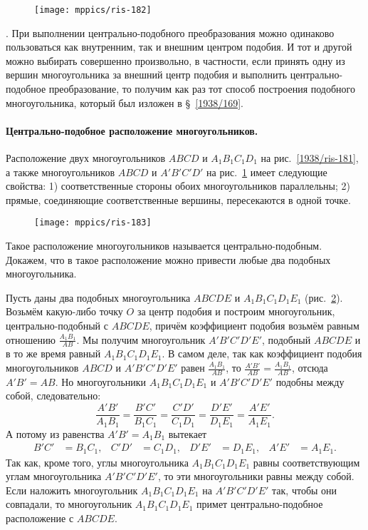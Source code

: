 \begin{figure}[h]
\centering
\texttt{[image: mppics/ris-182]}
\caption{}\label{1938/ris-182}
\end{figure}

\smallskip
{}.
При выполнении центрально-подобного преобразования можно одинаково пользоваться как внутренним, так и внешним центром подобия.
И тот и другой можно выбирать совершенно произвольно, в частности, если принять одну из вершин многоугольника за внешний центр подобия и выполнить центрально-подобное преобразование, то получим как раз тот способ построения подобного многоугольника, который был изложен в §~\ref{1938/169}.

\paragraph{Центрально-подобное расположение многоугольников.}\label{1938/176}
Расположение двух многоугольников $ABCD$ и $A_1B_1C_1D_1$ на рис.~\ref{1938/ris-181}, а также многоугольников $ABCD$ и $A'B'C'D'$ на рис.~\ref{1938/ris-182} имеет следующие свойства:
1) соответственные стороны обоих многоугольников параллельны;
2) прямые, соединяющие соответственные вершины, пересекаются в одной точке.

\begin{figure}[h]
\centering
\texttt{[image: mppics/ris-183]}
\caption{}\label{1938/ris-183}
\end{figure}

{\sloppy 
Такое расположение многоугольников называется центрально-подобным. 
Докажем, что в такое расположение можно привести любые два подобных многоугольника.

}

Пусть даны два подобных многоугольника $ABCDE$ и $A_1B_1C_1D_1E_1$ (рис.~\ref{1938/ris-183}).
Возьмём какую-либо точку $O$ за центр подобия и построим многоугольник, центрально-подобный  с $ABCDE$, причём коэффициент подобия возьмём равным отношению $\frac{A_1B_1}{AB}$.
Мы получим многоугольник $A'B'C'D'E'$, подобный $ABCDE$ и в то же время равный $A_1B_1C_1D_1E_1$.
В самом деле, так как коэффициент подобия многоугольников $ABCD$ и $A'B'C'D'E'$ равен $\frac{A_1B_1}{AB}$, то $\frac{A'B'}{AB}=\frac{A_1B_1}{AB}$, отсюда $A'B'=AB$.
Но многоугольники $A_1B_1C_1D_1E_1$ и $A'B'C'D'E'$ подобны между собой, следовательно:
\[\frac{A'B'}{A_1B_1}=\frac{B'C'}{B_1C_1}=\frac{C'D'}{C_1D_1}=\frac{D'E'}{D_1E_1}=\frac{A'E'}{A_1E_1}.\]
А потому из равенства $A'B'=A_1B_1$ вытекает 
\begin{align*}
B'C'&=B_1C_1,&
C'D'&=C_1D_1,&
D'E'&=D_1E_1,&
A'E'&=A_1E_1.
\end{align*}
Так как, кроме того, углы многоугольника $A_1B_1C_1D_1E_1$ равны соответствующим углам многоугольника $A'B'C'D'E'$, то эти многоугольники равны между собой. 
Если наложить многоугольник $A_1B_1C_1D_1E_1$ на  $A'B'C'D'E'$ так, чтобы они совпадали, то многоугольник $A_1B_1C_1D_1E_1$ примет центрально-подобное расположение с $ABCDE$. 

